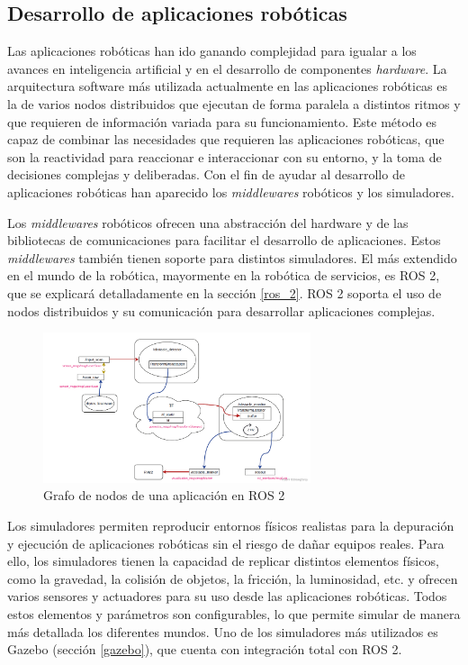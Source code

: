 \subsection{Desarrollo de aplicaciones robóticas}

Las aplicaciones robóticas han ido ganando complejidad para igualar a los avances en inteligencia artificial y en el desarrollo de componentes \textit{hardware}. La arquitectura software más utilizada actualmente en las aplicaciones robóticas es la de varios nodos distribuidos que ejecutan de forma paralela a distintos ritmos y que requieren de información variada para su funcionamiento. Este método es capaz de combinar las necesidades que requieren las aplicaciones robóticas, que son la reactividad para reaccionar e interaccionar con su entorno, y la toma de decisiones complejas y deliberadas. Con el fin de ayudar al desarrollo de aplicaciones robóticas han aparecido los \textit{middlewares} robóticos y los simuladores.

Los \textit{middlewares} robóticos ofrecen una abstracción del hardware y de las bibliotecas de comunicaciones para facilitar el desarrollo de aplicaciones. Estos \textit{middlewares} también tienen soporte para distintos simuladores. El más extendido en el mundo de la robótica, mayormente en la robótica de servicios, es ROS 2, que se explicará detalladamente en la sección \ref{ros_2}. ROS 2 soporta el uso de nodos distribuidos y su comunicación para desarrollar aplicaciones complejas.

\begin{figure}[H]
    \centering
    \includegraphics[width=0.7\textwidth]{figures/intro/c_graph.png}
    \caption{Grafo de nodos de una aplicación en ROS 2}
    \label{fig:ejemplo}
\end{figure}

Los simuladores permiten reproducir entornos físicos realistas para la depuración y ejecución de aplicaciones robóticas sin el riesgo de dañar equipos reales. Para ello, los simuladores tienen la capacidad de replicar distintos elementos físicos, como la gravedad, la colisión de objetos, la fricción, la luminosidad, etc. y ofrecen varios sensores y actuadores para su uso desde las aplicaciones robóticas. Todos estos elementos y parámetros son configurables, lo que permite simular de manera más detallada los diferentes mundos. Uno de los simuladores más utilizados es Gazebo (sección \ref{gazebo}), que cuenta con integración total con ROS 2.

